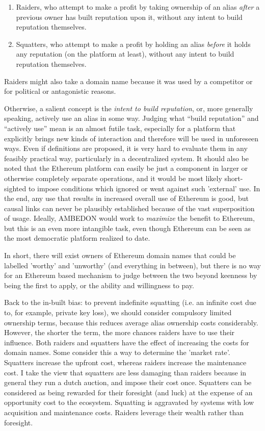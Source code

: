 \documentclass[10pt,a4paper]{article}
\begin{document}
\begin{enumerate}
\item Raiders, who attempt to make a profit by taking ownership of an alias {\it after} a previous owner has built reputation upon it, without any intent to build reputation themselves.
\item Squatters, who attempt to make a profit by holding an alias {\it before} it holds any reputation (on the platform at least), without any intent to build reputation themselves. 
\end{enumerate}

Raiders might also take a domain name because it was used by a competitor or for political or antagonistic reasons.
 
Otherwise, a salient concept is the {\it intent to build reputation}, or, more generally speaking, actively use an alias in some way. Judging what ``build reputation'' and ``actively use'' mean is an almost futile task, especially for a platform that explicitly brings new kinds of interaction and therefore will be used in unforeseen ways. Even if definitions are proposed, it is very hard to evaluate them in any feasibly practical way, particularly in a decentralized system. It should also be noted that the Ethereum platform can easily be just a component in larger or otherwise completely separate operations, and it would be most likely short-sighted to impose conditions which ignored or went against such 'external' use. In the end, any use that results in increased overall use of Ethereum is good, but causal links can never be plausibly established because of the vast superposition of usage. Ideally, AMBEDON would work to {\it maximize} the benefit to Ethereum, but this is an even more intangible task, even though Ethereum can be seen as the most democratic platform realized to date.

In short, there will exist owners of Ethereum domain names that could be labelled 'worthy' and 'unworthy' (and everything in between), but there is no way for an Ethereum based mechanism to judge between the two beyond keenness by being the first to apply, or the ability and willingness to pay. 

Back to the in-built bias: to prevent indefinite squatting (i.e. an infinite cost due to, for example, private key loss), we should consider compulsory limited ownership terms, because this reduces average alias ownership costs considerably. However, the shorter the term, the more chances raiders have to use their influence. Both raiders and squatters have the effect of increasing the costs for domain names. Some consider this a way to determine the 'market rate'. Squatters increase the upfront cost, whereas raiders increase the maintenance cost. I take the view that squatters are less damaging than raiders because in general they run a dutch auction, and impose their cost once. Squatters can be considered as being rewarded for their foresight (and luck) at the expense of an opportunity cost to the ecosystem. Squatting is aggravated by systems with low acquisition and maintenance costs. Raiders leverage their wealth rather than foresight. 
\end{document}
